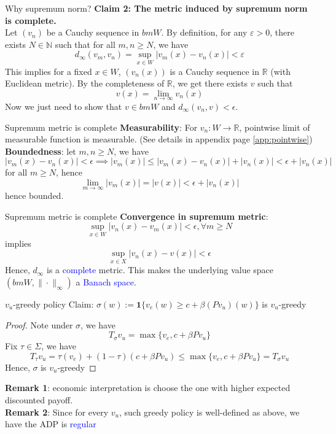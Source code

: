 \documentclass[aspectratio=169]{beamer} %
\begin{document}
\begin{frame}{Why supremum norm?}
\textbf{Claim 2: The metric induced by supremum norm is complete.}\\
Let $(v_n)$ be a Cauchy sequence in $bmW$. By definition, for any $\varepsilon>0$, there exists $N\in \mathbb{N}$ such that for all $m,n\ge N$, we have
$$
d_\infty (v_m,v_n) = \sup_{x\in W}|v_m(x)-v_n(x)|<\varepsilon
$$
This implies for a fixed $x\in W$, $(v_n(x))$ is a Cauchy sequence in $\mathbb{R}$ (with Euclidean metric). By the completeness of $\mathbb{R}$, we get there exists $v$ such that
$$
v(x) = \lim_{n\to\infty }v_n(x)
$$
Now we just need to show that $v\in bmW$ and $d_\infty(v_n,v)<\epsilon$.
\end{frame}
\begin{frame}{Supremum metric is complete}
\textbf{Measurability}: For $v_n:W\to\mathbb{R}$, pointwise limit of measurable function is measurable. (See details in appendix page \ref{app:pointwise})\\
\textbf{Boundedness}: let $m,n\ge N$, we have
$$
|v_m(x) - v_n(x)|<\epsilon \implies |v_m(x)|\le |v_m(x)-v_n(x)|+|v_n(x)|<\epsilon + |v_n(x)|
$$
for all $m\ge N$, hence
$$
\lim_{m\to\infty}|v_m(x)| = |v(x)|<\epsilon +|v_n(x)|
$$
hence bounded.
\end{frame}
\begin{frame}{Supremum metric is complete}
    \textbf{Convergence in supremum metric}:
    $$
    \sup_{x\in W}|v_n(x)-v_m(x)|<\epsilon,\forall m\ge N
    $$
    implies
    $$
    \sup_{x\in X} |v_n(x)-v(x)| <\epsilon 
    $$
    Hence, $d_\infty$ is a \textcolor{blue}{complete} metric. This makes the underlying value space $(bmW,\|\cdot\|_\infty)$ a \textcolor{blue}{Banach space}.
\end{frame}
\begin{frame}{$v_u$-greedy policy}
    Claim: $\sigma(w):= \mathbf{1}\{v_e(w)\ge c+\beta (Pv_u)(w)\}$ is $v_u$-greedy
    \begin{proof}
    Note under $\sigma$, we have
    $$
    T_\sigma v_u = \max\{v_e , c+\beta Pv_u\}
    $$
        Fix $\tau\in \Sigma$, we have
        $$
        T_\tau v_u = \tau(v_e) + (1-\tau)(c+\beta Pv_u) \le \max\{v_e, c+\beta Pv_u\} = T_\sigma v_u
        $$
    Hence, $\sigma$ is $v_u$-greedy
    \end{proof}
    \textbf{Remark 1}: economic interpretation is choose the one with higher expected discounted payoff.\\
    \textbf{Remark 2}: Since for every $v_u$, such greedy policy is well-defined as above, we have the ADP is \textcolor{blue}{regular}
\end{frame}
\end{document}
